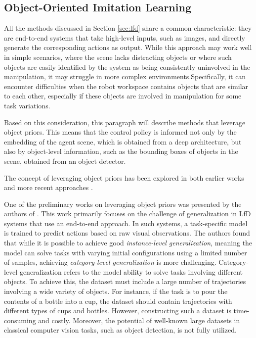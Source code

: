 \subsection{Object-Oriented Imitation Learning}
\label{sec:ooil}
All the methods discussed in Section \ref{sec:lfd} share a common characteristic: they are end-to-end systems that take high-level inputs, such as images, and directly generate the corresponding actions as output. While this approach may work well in simple scenarios, where the scene lacks distracting objects or where such objects are easily identified by the system as being consistently uninvolved in the manipulation, it may struggle in more complex environments.Specifically, it can encounter difficulties when the robot workspace contains objects that are similar to each other, especially if these objects are involved in manipulation for some task variations.

Based on this consideration, this paragraph will describe methods that leverage object priors. This means that the control policy is informed not only by the embedding of the agent scene, which is obtained from a deep architecture, but also by object-level information, such as the bounding boxes of objects in the scene, obtained from an object detector.

The concept of leveraging object priors has been explored in both earlier works \cite{devin2018deep,park2021object} and more recent approaches \cite{belkhale2023plato,zhu2023viola,zhu2023learning,jiang2023vima}.

One of the preliminary works on leveraging object priors was presented by the authors of \cite{devin2018deep}. This work primarily focuses on the challenge of generalization in LfD systems that use an end-to-end approach. In such systems, a task-specific model is trained to predict actions based on raw visual observations. The authors found that while it is possible to achieve good \textit{instance-level generalization}, meaning the model can solve tasks with varying initial configurations using a limited number of samples, achieving \textit{category-level generalization} is more challenging. Category-level generalization refers to the model ability to solve tasks involving different objects. To achieve this, the dataset must include a large number of trajectories involving a wide variety of objects. For instance, if the task is to pour the contents of a bottle into a cup, the dataset should contain trajectories with different types of cups and bottles. However, constructing such a dataset is time-consuming and costly. Moreover, the potential of well-known large datasets in classical computer vision tasks, such as object detection, is not fully utilized.

